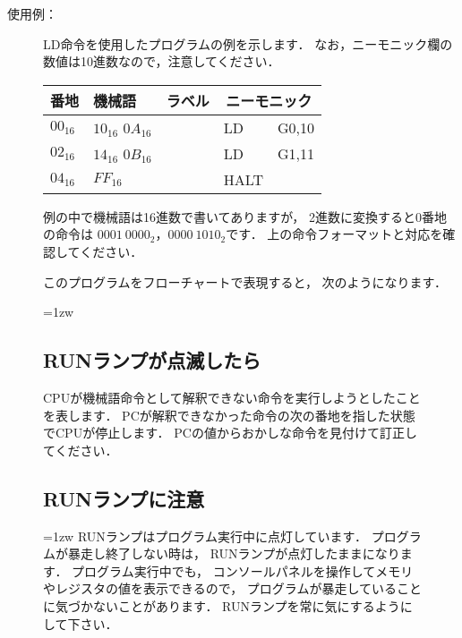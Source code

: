 \begin{description}
\begin{center}
\end{center}

\item[使用例：]LD命令を使用したプログラムの例を示します．
なお，ニーモニック欄の数値は10進数なので，注意してください．

{\tt\small\begin{center}
\begin{tabular}{|l|l|l|l l|} \hline
番地 & 機械語 & ラベル & \multicolumn{2}{|c|}{ニーモニック} \\
\hline
$00_{16}$ & $10_{16}$ $0A_{16}$ & & LD   & G0,10 \\
$02_{16}$ & $14_{16}$ $0B_{16}$ & & LD   & G1,11 \\
$04_{16}$ & $FF_{16}$           & & HALT &       \\
\hline
\end{tabular}
\end{center}}

例の中で機械語は16進数で書いてありますが，
2進数に変換すると0番地の命令は $0001~0000_2$，$0000~1010_2$です．
上の命令フォーマットと対応を確認してください．

このプログラムをフローチャートで表現すると，
次のようになります．

\begin{center}
\end{center}

\end{description}

\begin{figure}[tbp]
\begin{framed}{\parindent=1zw
\subsection*{RUNランプが点滅したら}
CPUが機械語命令として解釈できない命令を実行しようとしたことを表します．
PCが解釈できなかった命令の次の番地を指した状態でCPUが停止します．
PCの値からおかしな命令を見付けて訂正してください．
}\end{framed}
\end{figure}

\begin{figure}[btp]
\begin{framed}
\subsection*{RUNランプに注意}{\parindent=1zw
RUNランプはプログラム実行中に点灯しています．
プログラムが暴走し終了しない時は，
RUNランプが点灯したままになります．
プログラム実行中でも，
コンソールパネルを操作してメモリやレジスタの値を表示できるので，
プログラムが暴走していることに気づかないことがあります．
RUNランプを常に気にするようにして下さい．
}\end{framed}
\end{figure}

